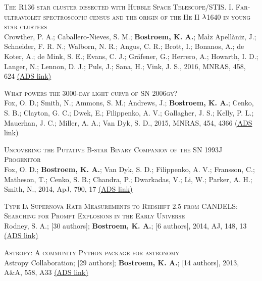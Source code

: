 \begin{revnumerate}[14]
\item{\textsc{The R136 star cluster dissected with Hubble Space Telescope/STIS. I. Far-ultraviolet spectroscopic census and the origin of the He II $\rm{\lambda}$1640 in young star clusters}\\ 
Crowther, P. A.; Caballero-Nieves, S. M.; {\bf Bostroem, K. A.}; Ma\`{i}z Apell\`{a}niz, J.; Schneider, F. R. N.; Walborn, N. R.; Angus, C. R.; Brott, I.; Bonanos, A.; de Koter, A.; de Mink, S. E.; Evans, C. J.; Gr\"{a}fener, G.; Herrero, A.; Howarth, I. D.; Langer, N.; Lennon, D. J.; Puls, J.; Sana, H.; Vink, J. S., 2016, MNRAS, 458, 624
\color{blue}\href{https://ui.adsabs.harvard.edu/#abs/2016MNRAS.458..624C/abstract}{(ADS link)}\color{black}}\\

\item{\textsc{What powers the 3000-day light curve of SN 2006gy?}\\ 
Fox, O. D.; Smith, N.; Ammons, S. M.; Andrews, J.; {\bf Bostroem, K. A.}; Cenko, S. B.; Clayton, G. C.; Dwek, E.; Filippenko, A. V.; Gallagher, J. S.; Kelly, P. L.; Mauerhan, J. C.; Miller, A. A.; Van Dyk, S. D., 2015, MNRAS, 454, 4366
\color{blue}\href{https://ui.adsabs.harvard.edu/#abs/2015MNRAS.454.4366F/abstract}{(ADS link)}\color{black}}\\

\item{\textsc{Uncovering the Putative B-star Binary Companion of the SN 1993J Progenitor}\\
Fox, O. D.; {\bf Bostroem, K. A.}; Van Dyk, S. D.; Filippenko, A. V.; Fransson, C.; Matheson, T.; Cenko, S. B.; Chandra, P.; Dwarkadas, V.; Li, W.; Parker, A. H.; Smith, N., 2014, ApJ, 790, 17
\color{blue}\href{https://ui.adsabs.harvard.edu/#abs/2014ApJ...790...17F/abstract}{(ADS link)}\color{black}}\\

\item{\textsc{Type Ia Supernova Rate Measurements to Redshift 2.5 from CANDELS: Searching for Prompt Explosions in the Early Universe}\\ 
Rodney, S. A.; [30 authors]; {\bf Bostroem, K. A.}; [6 authors], 2014, AJ, 148, 13
\color{blue}\href{https://ui.adsabs.harvard.edu/#abs/2014AJ....148...13R/abstract}{(ADS link)}\color{black}}\\

\item{\textsc{Astropy: A community Python package for astronomy}\\ 
Astropy Collaboration; [29 authors]; {\bf Bostroem, K. A.}; [14 authors], 2013, A\&A, 558, A33
\color{blue}\href{https://ui.adsabs.harvard.edu/#abs/2013A\%26A...558A..33A/abstract}{(ADS link)}\color{black}} \\
\end{revnumerate}































